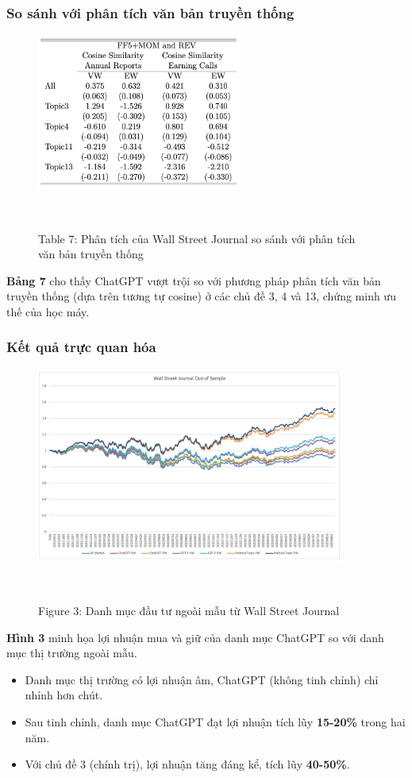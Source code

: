 \documentclass[a4paper,12pt]{article}
\begin{document}
\subsubsection{So sánh với phân tích văn bản truyền thống}
\begin{figure}[H]
    \centering
    \includegraphics[width=0.6\textwidth]{table/tab7a.png}
    \caption*{Table 7: Phân tích của Wall Street Journal so sánh với phân tích văn bản truyền thống}
    \
\end{figure}
\textbf{Bảng 7} cho thấy ChatGPT vượt trội so với phương pháp phân tích văn bản truyền thống (dựa trên tương tự cosine) ở các chủ đề 3, 4 và 13, chứng minh ưu thế của học máy.

\subsubsection{Kết quả trực quan hóa}
\begin{figure}[H]
    \centering
    \includegraphics[width=0.9\textwidth]{fig/fig3.png}
    \caption*{Figure 3: Danh mục đầu tư ngoài mẫu từ Wall Street Journal}
    \
\end{figure}
\textbf{Hình 3} minh họa lợi nhuận mua và giữ của danh mục ChatGPT so với danh mục thị trường ngoài mẫu.
\begin{itemize}
    \item Danh mục thị trường có lợi nhuận âm, ChatGPT (không tinh chỉnh) chỉ nhỉnh hơn chút.
    \item Sau tinh chỉnh, danh mục ChatGPT đạt lợi nhuận tích lũy \textbf{15-20\%} trong hai năm.
    \item Với chủ đề 3 (chính trị), lợi nhuận tăng đáng kể, tích lũy \textbf{40-50\%}.
\end{itemize}
\end{document}
